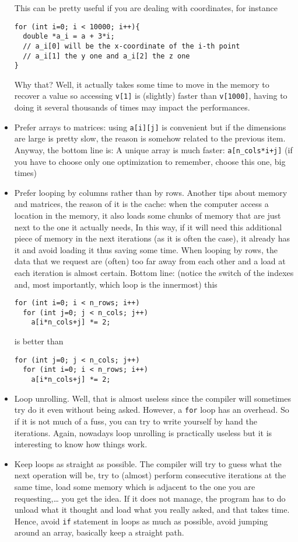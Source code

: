 \documentclass[a4paper,12pt,%
              final%
              ]{article}
\begin{document}
\begin{itemize}
\begin{verbatim}
\end{verbatim}
        This can be pretty useful if you are dealing with coordinates, for instance
\begin{verbatim}
for (int i=0; i < 10000; i++){
  double *a_i = a + 3*i;
  // a_i[0] will be the x-coordinate of the i-th point
  // a_i[1] the y one and a_i[2] the z one
}
\end{verbatim}
        Why that? Well, it actually takes some time to move in the memory to recover a value so accessing \texttt{v[1]} is (slightly) faster than \texttt{v[1000]}, having to doing it several thousands of times may impact the performances.
      \item Prefer arrays to matrices: using \verb|a[i][j]| is convenient but if the dimensions are large is pretty slow, the reason is somehow related to the previous item. Anyway, the bottom line is: A unique array is much faster: \verb|a[n_cols*i+j]| (if you have to choose only one optimization to remember, choose this one, big times)
      \item Prefer looping by columns rather than by rows. Another tips about memory and matrices, the reason of it is the cache: when the computer access a location in the memory, it also loads some chunks of memory that are just next to the one it actually needs, In this way, if it will need this additional piece of memory in the next iterations (as it is often the case), it already has it and avoid loading it thus saving some time. When looping by rows, the data that we request are (often) too far away from each other and a load at each iteration is almost certain. Bottom line: (notice the switch of the indexes and, most importantly, which loop is the innermost) this
\begin{verbatim}
for (int i=0; i < n_rows; i++)
  for (int j=0; j < n_cols; j++)
    a[i*n_cols+j] *= 2;
\end{verbatim}
        is better than
\begin{verbatim}
for (int j=0; j < n_cols; j++)
  for (int i=0; i < n_rows; i++)
    a[i*n_cols+j] *= 2;
\end{verbatim}
      \item Loop unrolling. Well, that is almost useless since the compiler will sometimes try do it even without being asked. However, a \texttt{for} loop has an overhead. So if it is not much of a fuss, you can try to write yourself by hand the iterations. Again, nowadays loop unrolling is practically useless but it is interesting to know how things work.
      \item Keep loops as straight as possible. The compiler will try to guess what the next operation will be, try to (almost) perform consecutive iterations at the same time, load some memory which is adjacent to the one you are requesting,\ldots{} you get the idea. If it does not manage, the program has to do unload what it thought and load what you really asked, and that takes time. Hence, avoid \texttt{if} statement in loops as much as possible, avoid jumping around an array, basically keep a straight path.

\end{itemize}
\end{document}
